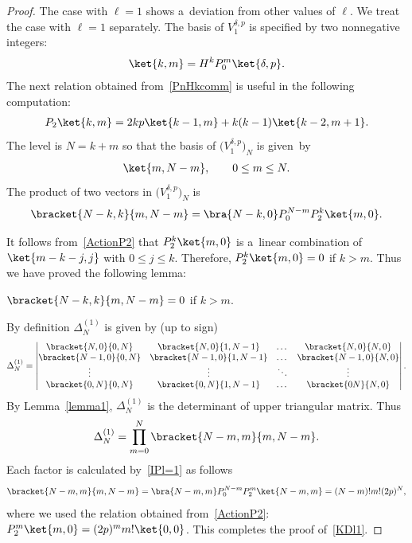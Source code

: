 \documentclass[pdftex]{sigma}
\numberwithin{equation}{section}
\begin{document}
\begin{proof}
The case with $ \ell = 1 $ shows a~deviation from other values of $ \ell$.
We treat the case with $ \ell = 1 $ separately.
The basis of $ V^{\delta,p}_1 $ is specif\/ied by two nonnegative integers:
\begin{gather*}
\ket{k,m} = H^k P_0^m \ket{\delta,p}.
\end{gather*}
The next relation obtained from~\eqref{PnHkcomm} is useful in the following computation:
\begin{gather}
P_2 \ket{k,m} = 2kp \ket{k-1,m} + k(k-1) \ket{k-2,m+1}.
\label{ActionP2}
\end{gather}
The level is $ N = k +m $ so that the basis of $ \big(V^{\delta,p}_1\big)_N $ is given~by
\begin{gather*}
\ket{m,N-m},
\qquad
0 \leq m \leq N.
\end{gather*}
The product of two vectors in $ \big(V^{\delta,p}_1\big)_N $ is
\begin{gather}
\bracket{N-k,k}{m,N-m} = \bra{N-k,0} P_0^{N-m} P_2^k \ket{m,0}.
\label{IPl=1}
\end{gather}

It follows from~\eqref{ActionP2} that $P_2^k \ket{m,0}$ is a~linear combination of $ \ket{m-k-j,j} $ with $0 \leq j
\leq k$.
Therefore, $ P_2^k \ket{m,0} = 0$ if $k > m$.
Thus we have proved the following lemma:

\begin{lemma}
\label{lemma1}
$ \bracket{N-k,k}{m,N-m} = 0 $ if $ k > m$.
\end{lemma}

By def\/inition $ \Delta^{(1)}_N $ is given by (up to sign)
\begin{gather*}
\Delta^{(1)}_N = \left|
\begin{matrix}
 \bracket{N,0}{0,N} & \bracket{N,0}{1,N-1} & \dots & \bracket{N,0}{N,0}
\\
\bracket{N-1,0}{0,N} & \bracket{N-1,0}{1,N-1} & \dots & \bracket{N-1,0}{N,0}
\\
\vdots & \vdots & \ddots & \vdots
\\
\bracket{0,N}{0,N} & \bracket{0,N}{1,N-1} & \dots & \bracket{0N}{N,0}
\end{matrix}
\right|.
\end{gather*}
By Lemma~\ref{lemma1}, $ \Delta^{(1)}_N $ is the determinant of upper triangular matrix.
Thus
\begin{gather*}
\Delta_N^{(1)} = \prod\limits_{m=0}^N \bracket{N-m,m}{m,N-m}.
\end{gather*}
Each factor is calculated by~\eqref{IPl=1} as follows
\begin{gather*}
\bracket{N-m,m}{m,N-m} = \bra{N-m,m} P_0^{N-m} P_2^m \ket{N-m,m} = (N-m)!   m!   (2p)^N,
\end{gather*}
where we used the relation obtained from~\eqref{ActionP2}: $ P_2^m \ket{m,0} = (2p)^m m ! \ket{0,0}$.
This completes the proof of~\eqref{KDl1}.


\end{proof}
\end{document}
